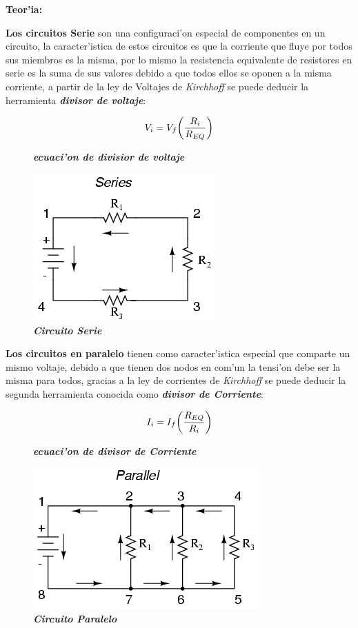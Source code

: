 \documentclass[11pt, letterpaper]{report}
\newenvironment{block}[1]{\hspace{-0.8 cm}\textbf{\Large #1}}{\vspace{3 mm}} %
\begin{document}
	\begin{block}{Teor'ia:}
	
	  \textbf{Los circuitos Serie} son una configuraci'on especial de componentes en un circuito, la caracter'istica de estos circuitos es que la corriente que fluye por todos sus miembros es la misma, por lo mismo la resistencia equivalente de resistores en serie es la suma de sus valores debido a que todos ellos se oponen a la misma corriente, a partir de la ley de Voltajes de \emph{Kirchhoff} se puede deducir la herramienta \textbf{\emph{divisor de voltaje}}:
	  
	  \begin{figure}[H] %
	  \[V_i = V_f \biggl( \frac{R_i}{R_{\tiny EQ}} \biggr)\]
	  \caption{\textbf{\emph{ecuaci'on de divisior de voltaje}}}
	  \end{figure}
	  
	\begin{figure}[H]
	\hfill\includegraphics[scale=0.5]{img/serie.png}\hspace*{\fill}
	\caption{\textbf{\emph{Circuito Serie}}}
	\end{figure}
	
	\textbf{Los circuitos en paralelo} tienen como caracter'istica especial que comparte un mismo voltaje, debido a que tienen dos nodos en com'un la tensi'on debe ser la misma para todos, gracias a la ley de corrientes de \emph{Kirchhoff} se puede deducir la segunda herramienta conocida como \textbf{\emph{divisor de Corriente}}:

		\begin{figure}[H]
		\[I_i = I_f \biggl( \frac{R_{\tiny EQ}}{R_i} \biggr)\]
		\caption{\textbf{\emph{ecuaci'on de divisor de Corriente}}}
		\end{figure}
	
		 \begin{figure}[H]
		 \hfill\includegraphics[scale=.5]{img/paralelo.png}\hspace*{\fill}
		 \caption{\textbf{\emph{Circuito Paralelo}}}
		 \end{figure}
	\end{block}
		
\end{document}

